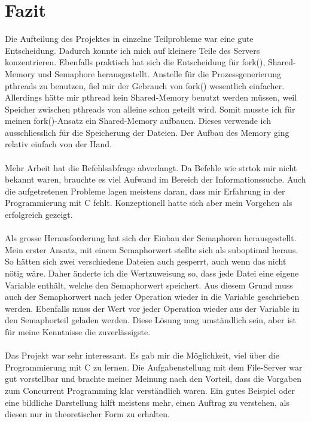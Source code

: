 \documentclass[12pt,a4paper,ngerman]{report}
\begin{document}
\chapter{Fazit}
Die Aufteilung des Projektes in einzelne Teilprobleme war eine gute Entscheidung. Dadurch konnte ich mich auf kleinere Teile des Servers konzentrieren. Ebenfalls praktisch hat sich die Entscheidung für fork(), Shared-Memory und Semaphore herausgestellt. Anstelle für die Prozessgenerierung pthreads zu benutzen, fiel mir der Gebrauch von fork() wesentlich einfacher. Allerdings hätte mir pthread kein Shared-Memory benutzt werden müssen, weil Speicher zwischen pthreads von alleine schon geteilt wird. Somit musste ich für meinen fork()-Ansatz ein Shared-Memory aufbauen. Dieses verwende ich ausschliesslich für die Speicherung der Dateien. Der Aufbau des Memory ging relativ einfach von der Hand.\\
\\
Mehr Arbeit hat die Befehlsabfrage abverlangt. Da Befehle wie strtok mir nicht bekannt waren, brauchte es viel Aufwand im Bereich der Informationssuche. Auch die aufgetretenen Probleme lagen meistens daran, dass mir Erfahrung in der Programmierung mit C fehlt. Konzeptionell hatte sich aber mein Vorgehen als erfolgreich gezeigt. \\
\\
Als grosse Herausforderung hat sich der Einbau der Semaphoren herausgestellt. Mein erster Ansatz, mit einem Semaphorwert stellte sich als suboptimal heraus. So hätten sich zwei verschiedene Dateien auch gesperrt, auch wenn das nicht nötig wäre. Daher änderte ich die Wertzuweisung so, dass jede Datei eine eigene Variable enthält, welche den Semaphorwert speichert. Aus diesem Grund muss auch der Semaphorwert nach jeder Operation wieder in die Variable geschrieben werden. Ebenfalls muss der Wert vor jeder Operation wieder aus der Variable in den Semaphorteil geladen werden. Diese Lösung mag umständlich sein, aber ist für meine Kenntnisse die zuverlässigste.\\
\\
Das Projekt war sehr interessant. Es gab mir die Möglichkeit, viel über die Programmierung mit C zu lernen. Die Aufgabenstellung mit dem File-Server war gut vorstellbar und brachte meiner Meinung nach den Vorteil, dass die Vorgaben zum Concurrent Programming klar verständlich waren. Ein gutes Beispiel oder eine bildliche Darstellung hilft meistens mehr, einen Auftrag zu verstehen, als diesen nur in theoretischer Form zu erhalten.
\end{document}
